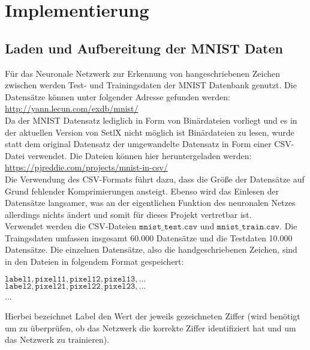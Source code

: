 \chapter{Implementierung}

\section{Laden und Aufbereitung der MNIST Daten}
Für das Neuronale Netzwerk zur Erkennung von hangeschriebenen Zeichen zwischen werden Test- und Trainingsdaten der MNIST Datenbank genutzt. Die Datensätze können unter folgender Adresse gefunden werden: 
\\[0.2cm]
\hspace*{1.3cm}
\href{http://yann.lecun.com/exdb/mnist/}{http://yann.lecun.com/exdb/mnist/}
\\[0.2cm]
Da der MNIST Datensatz lediglich in Form von Binärdateien vorliegt und es in der aktuellen Version von SetlX nicht möglich ist Binärdateien zu lesen, wurde statt dem original Datensatz der umgewandelte Datensatz in Form einer CSV-Datei verwendet. Die Dateien können hier heruntergeladen werden:
\\[0.2cm]
\hspace*{1.3cm}
\href{https://pjreddie.com/projects/mnist-in-csv/}{https://pjreddie.com/projects/mnist-in-csv/}
\\[0.2cm]
Die Verwendung des CSV-Formats führt dazu, dass die Größe der Datensätze auf Grund fehlender Komprimierungen ansteigt. Ebenso wird das Einlesen der Datensätze langsamer, was an der eigentlichen Funktion des neuronalen Netzes allerdings nichts ändert und somit für dieses Projekt vertretbar ist. \\
Verwendet werden die CSV-Dateien $\mathtt{mnist\_test.csv}$ und $\mathtt{mnist\_train.csv}$. Die Traingsdaten umfassen insgesamt 60.000 Datensätze und die Testdaten 10.000 Datensätze. 
Die einzelnen Datensätze, also die handgeschriebenen Zeichen, sind in den Dateien in folgendem Format gespeichert:
\begin{center}
	$\mathtt{label1, pixel11, pixel12, pixel13, ...}$ \\
	$\mathtt{label2, pixel21, pixel22, pixel23, ...}$ \\
	...
\end{center}
Hierbei bezeichnet Label den Wert der jeweils gezeichneten Ziffer (wird benötigt um zu überprüfen, ob das Netzwerk die korrekte Ziffer identifiziert hat und um das Netzwerk zu trainieren). \\ \\
